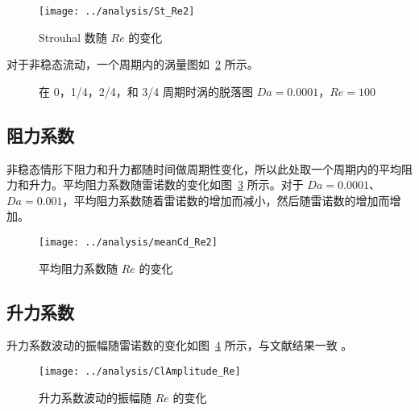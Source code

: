 \begin{figure}
	\centering
	\texttt{[image: ../analysis/St\_Re2]}
	\caption{Strouhal 数随 $Re$ 的变化}
	\label{fig: St}
\end{figure}

对于非稳态流动，一个周期内的涡量图如~\ref{fig: 4*vortex} 所示。

\begin{figure}
	\centering
	\begin{minipage}{\textwidth}
		\centering
	\end{minipage}
	\centering
	\begin{minipage}{\textwidth}
		\centering
	\end{minipage}
	\caption{在 0，1/4，2/4，和 3/4 周期时涡的脱落图 $Da=0.0001$，$Re=100$}
	\label{fig: 4*vortex}
\end{figure}

\subsection{阻力系数}

非稳态情形下阻力和升力都随时间做周期性变化，所以此处取一个周期内的平均阻力和升力。平均阻力系数随雷诺数的变化如图~\ref{fig: meanCd} 所示。对于 $Da=0.0001$、$Da=0.001$，平均阻力系数随着雷诺数的增加而减小，然后随雷诺数的增加而增加。

\begin{figure}
	\centering
	\texttt{[image: ../analysis/meanCd\_Re2]}
	\caption{平均阻力系数随 $Re$ 的变化}
	\label{fig: meanCd}
\end{figure}

\subsection{升力系数}

升力系数波动的振幅随雷诺数的变化如图~\ref{fig: ClAmplitude} 所示，与文献结果一致 \cite{Park1998}。

\begin{figure}
	\centering
	\texttt{[image: ../analysis/ClAmplitude\_Re]}
	\caption{升力系数波动的振幅随 $Re$ 的变化}
	\label{fig: ClAmplitude}
\end{figure}

